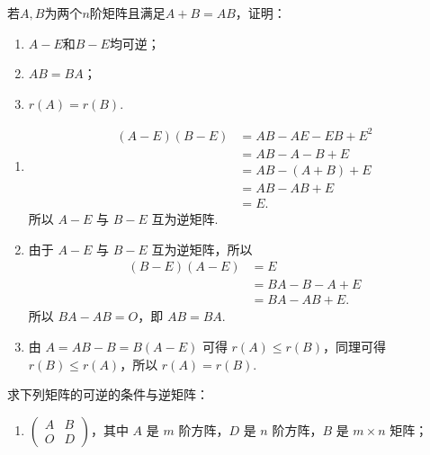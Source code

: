 \begin{exercise}
\begin{exgroup}
\begin{answer}
        \end{answer}

        \item 若$A,B$为两个$n$阶矩阵且满足$A+B=AB$，证明：
        \begin{enumerate}
            \item $A-E$和$B-E$均可逆；

            \item $AB=BA$；

            \item $r(A)=r(B)$.
        \end{enumerate}
        \begin{answer}
            \begin{enumerate}
                \item \begin{align*}
                          (A - E)(B - E) & = AB - AE - EB + E^2 \\
                                         & = AB - A - B + E     \\
                                         & = AB - (A + B) + E   \\
                                         & = AB - AB + E        \\
                                         & = E.
                      \end{align*}
                      所以 $ A - E $ 与 $ B - E $ 互为逆矩阵.

                \item 由于 $ A - E $ 与 $ B - E $ 互为逆矩阵，所以
                      \begin{align*}
                          (B - E)(A - E) & = E              \\
                                         & = BA - B - A + E \\
                                         & = BA - AB + E.
                      \end{align*}
                      所以 $ BA - AB = O $，即 $ AB = BA $.

                \item 由 $ A = AB - B = B(A - E) $ 可得 $ r(A) \leqslant r(B) $，同理可得 $ r(B) \leqslant r(A) $，所以 $ r(A) = r(B) $.
            \end{enumerate}
        \end{answer}

        \item 求下列矩阵的可逆的条件与逆矩阵：
            \begin{enumerate}
                \item $\begin{pmatrix}
                        A & B \\ O & D
                    \end{pmatrix}$，其中 $A$ 是 $m$ 阶方阵，$D$ 是 $n$ 阶方阵，$B$ 是 $m \times n$ 矩阵；


\end{enumerate}
\end{exgroup}
\end{exercise}
